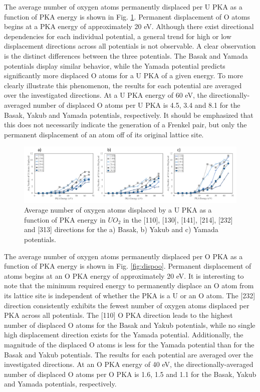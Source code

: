 \documentclass[8pt]{article}   	%
\begin{document}
The average number of oxygen atoms permanently displaced per U PKA as a function of PKA energy is shown in Fig. \ref{fig:dispou}. Permanent displacement of O atoms begins at a PKA energy of approximately 20 eV. Although there exist directional dependencies for each individual potential, a general trend for high or low displacement directions across all potentials is not observable. A clear observation is the distinct differences between the three potentials. The Basak and Yamada potentials display similar behavior, while the Yamada potential predicts significantly more displaced O atoms for a U PKA of a given energy. To more clearly illustrate this phenomenon, the results for each potential are averaged over the investigated directions. At a U PKA energy of 60 eV, the directionally-averaged number of displaced O atoms per U PKA is 4.5, 3.4 and 8.1 for the Basak, Yakub and Yamada potentials, respectively. It should be emphasized that this does not necessarily indicate the generation of a Frenkel pair, but only the permanent displacement of an atom off of its original lattice site.

\begin{figure}[h]
 \centering
 \includegraphics[width=1.0\textwidth]{dispO_U.png}
 \caption{Average number of oxygen atoms displaced by a U PKA as a function of PKA energy in $UO_2$ in the [110], [130], [141], [214], [232] and [313] directions for the a) Basak, b) Yakub and c) Yamada potentials.  }
 \label{fig:dispou}
\end{figure}

The average number of oxygen atoms permanently displaced per O PKA as a function of PKA energy is shown in Fig. \ref{fig:dispoo}. Permanent displacement of atoms begins at an O PKA energy of approximately 20 eV. It is interesting to note that the minimum required energy to permanently displace an O atom from its lattice site is independent of whether the PKA is a U or an O atom. The [232] direction consistently exhibits the fewest number of oxygen atoms displaced per PKA across all potentials. The [110] O PKA direction leads to the highest number of displaced O atoms for the Basak and Yakub potentials, while no single high displacement direction exists for the Yamada potential. Additionally, the magnitude of the displaced O atoms is less for the Yamada potential than for the Basak and Yakub potentials. The results for each potential are averaged over the investigated directions. At an O PKA energy of 40 eV, the directionally-averaged number of displaced O atoms per O PKA is 1.6, 1.5 and 1.1 for the Basak, Yakub and Yamada potentials, respectively.
\end{document}
